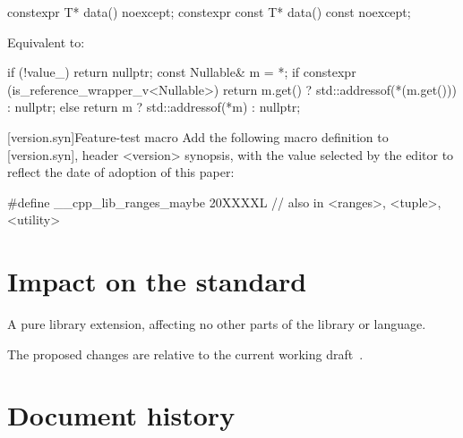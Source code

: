 \documentclass[a4paper,10pt,oneside,openany,final,article]{memoir}
\begin{document}
\begin{wording}
\begin{itemdecl}
  constexpr T* data() noexcept;
  constexpr const T* data() const noexcept;
\end{itemdecl}

\begin{itemdescr}
  \pnum{}
  \effects{}
  Equivalent to:

  \begin{codeblock}
    if (!value_)
    return nullptr;
    const Nullable& m = *;
    if constexpr (is_reference_wrapper_v<Nullable>) {
      return m.get() ? std::addressof(*(m.get())) : nullptr;
    } else {
      return m ? std::addressof(*m) : nullptr;
    }
  \end{codeblock}
\end{itemdescr}


[version.syn]{Feature-test macro}
Add the following macro definition to [version.syn], header <version> synopsis, with the value selected by the editor to reflect the date of adoption of this paper:

\begin{codeblock}
  #define __cpp_lib_ranges_maybe 20XXXXL // also in <ranges>, <tuple>, <utility>
\end{codeblock}

\end{wording}

\chapter{Impact on the standard}

A pure library extension, affecting no other parts of the library or language.

The proposed changes are relative to the current working draft~\cite{N4910}.

\chapter*{Document history}
\end{document}

